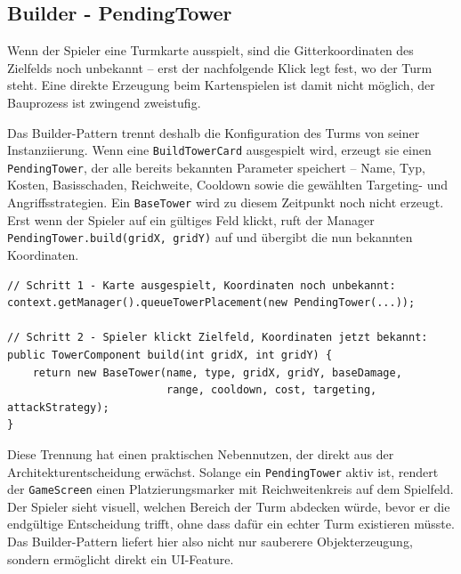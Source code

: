 \subsection{Builder - PendingTower}

Wenn der Spieler eine Turmkarte ausspielt, sind die Gitterkoordinaten des
Zielfelds noch unbekannt -- erst der nachfolgende Klick legt fest, wo der Turm
steht. Eine direkte Erzeugung beim Kartenspielen ist damit nicht möglich, der
Bauprozess ist zwingend zweistufig.

Das Builder-Pattern trennt deshalb die Konfiguration des Turms von seiner
Instanziierung. Wenn eine \texttt{BuildTowerCard} ausgespielt wird, erzeugt sie
einen \texttt{PendingTower}, der alle bereits bekannten Parameter speichert --
Name, Typ, Kosten, Basisschaden, Reichweite, Cooldown sowie die gewählten
Targeting- und Angriffsstrategien. Ein \texttt{BaseTower} wird zu diesem
Zeitpunkt noch nicht erzeugt. Erst wenn der Spieler auf ein gültiges Feld
klickt, ruft der Manager \texttt{PendingTower.build(gridX, gridY)} auf und
übergibt die nun bekannten Koordinaten.

\begin{lstlisting}[caption={Zweistufige Turmerzeugung mit PendingTower},label=lst:builder]
// Schritt 1 - Karte ausgespielt, Koordinaten noch unbekannt:
context.getManager().queueTowerPlacement(new PendingTower(...));

// Schritt 2 - Spieler klickt Zielfeld, Koordinaten jetzt bekannt:
public TowerComponent build(int gridX, int gridY) {
    return new BaseTower(name, type, gridX, gridY, baseDamage,
                         range, cooldown, cost, targeting, attackStrategy);
}
\end{lstlisting}

Diese Trennung hat einen praktischen Nebennutzen, der direkt aus der
Architekturentscheidung erwächst. Solange ein \texttt{PendingTower} aktiv ist,
rendert der \texttt{GameScreen} einen Platzierungsmarker mit Reichweitenkreis
auf dem Spielfeld. Der Spieler sieht visuell, welchen Bereich der Turm abdecken
würde, bevor er die endgültige Entscheidung trifft, ohne dass dafür ein echter
Turm existieren müsste. Das Builder-Pattern liefert hier also nicht nur
sauberere Objekterzeugung, sondern ermöglicht direkt ein UI-Feature.

